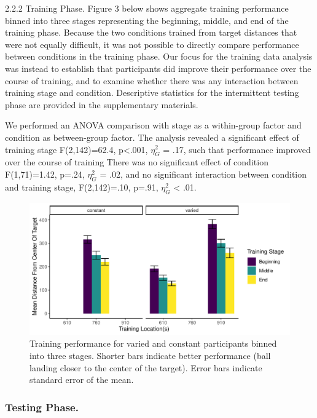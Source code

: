 \documentclass[
  jou, donotrepeattitle,floatsintext]{apa7}
\begin{document}
2.2.2 Training Phase. Figure 3 below shows aggregate training performance binned into three stages representing the beginning, middle, and end of the training phase. Because the two conditions trained from target distances that were not equally difficult, it was not possible to directly compare performance between conditions in the training phase. Our focus for the training data analysis was instead to establish that participants did improve their performance over the course of training, and to examine whether there was any interaction between training stage and condition. Descriptive statistics for the intermittent testing phase are provided in the supplementary materials.

We performed an ANOVA comparison with stage as a within-group factor and condition as between-group factor. The analysis revealed a significant effect of training stage F(2,142)=62.4, p\textless.001, \(\eta^{2}_G\) = .17, such that performance improved over the course of training There was no significant effect of condition F(1,71)=1.42, p=.24, \(\eta^{2}_G\) = .02, and no significant interaction between condition and training stage, F(2,142)=.10, p=.91, \(\eta^{2}_G\) \textless{} .01.



\begin{figure}
\centering
\includegraphics{IGAS_PJ_files/figure-latex/Training-1.pdf}
\caption{\label{fig:Training}Training performance for varied and constant participants binned into three stages. Shorter bars indicate better performance (ball landing closer to the center of the target). Error bars indicate standard error of the mean.}
\end{figure}

\hypertarget{testing-phase.}{%
\subsubsection{Testing Phase.}\label{testing-phase.}}
\end{document}

